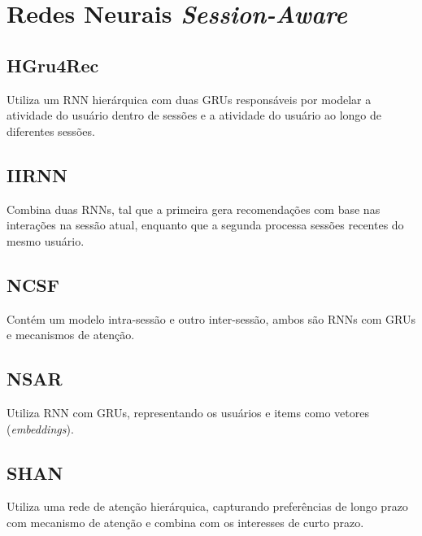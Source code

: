 \section{Redes Neurais \textit{Session-Aware}}

\subsection{HGru4Rec}
Utiliza um RNN hierárquica com duas GRUs
  responsáveis por modelar a atividade do usuário dentro de sessões e
  a atividade do usuário ao longo de diferentes sessões\cite{quadrana2017}.

\subsection{IIRNN}
Combina duas RNNs, tal que a primeira gera
  recomendações com base nas interações na sessão atual, enquanto que a
  segunda processa sessões recentes do mesmo usuário\cite{ruocco}.

\subsection{NCSF}
Contém um modelo intra-sessão e outro
  inter-sessão, ambos são RNNs com GRUs e mecanismos de atenção.
  
\subsection{NSAR}
Utiliza RNN com GRUs, representando os usuários
e items como vetores (\textit{embeddings})\cite{interintra}.


\subsection{SHAN}
Utiliza uma rede de atenção hierárquica,
capturando preferências de longo prazo com mecanismo de atenção e 
combina com os interesses de curto prazo\cite{shan}.